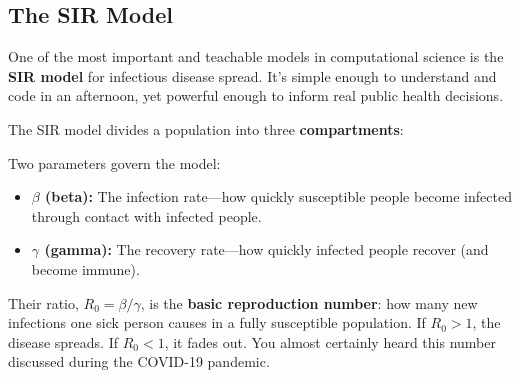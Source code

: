 \documentclass[11pt,letterpaper]{article}
\newcommand{\keyterm}[1]{\textbf{\textcolor{cssecondary}{#1}}}
\begin{document}
\subsection{The SIR Model}

One of the most important and teachable models in computational science is the \keyterm{SIR model} for infectious disease spread. It's simple enough to understand and code in an afternoon, yet powerful enough to inform real public health decisions.

The SIR model divides a population into three \keyterm{compartments}:

\begin{center}
\end{center}

Two parameters govern the model:
\begin{itemize}[itemsep=3pt]
    \item \textbf{$\beta$ (beta):} The infection rate---how quickly susceptible people become infected through contact with infected people.
    \item \textbf{$\gamma$ (gamma):} The recovery rate---how quickly infected people recover (and become immune).
\end{itemize}

Their ratio, $R_0 = \beta / \gamma$, is the \keyterm{basic reproduction number}: how many new infections one sick person causes in a fully susceptible population. If $R_0 > 1$, the disease spreads. If $R_0 < 1$, it fades out. You almost certainly heard this number discussed during the COVID-19 pandemic.
\end{document}
